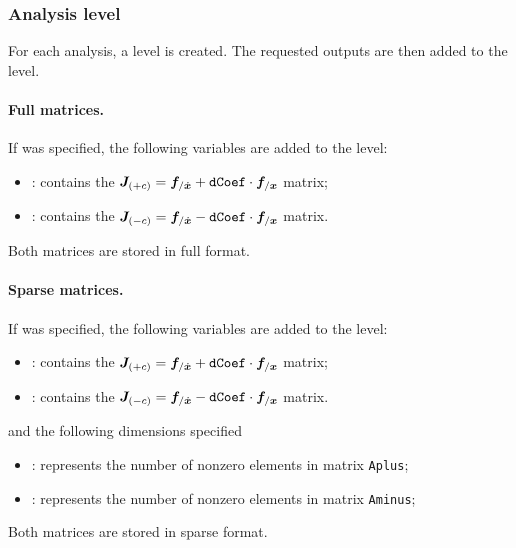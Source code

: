 \subsubsection{Analysis level}
For each analysis, a level  is created. The requested outputs 
are then added to the level.

\paragraph{Full matrices.}
If  was specified, the following variables are added to the
 level:
\begin{itemize}
\item {} : contains the 
    $\boldsymbol{J}_{(+c)} = \boldsymbol{f}_{/\dot{\boldsymbol{x}}} + \texttt{dCoef} \cdot \boldsymbol{f}_{/\boldsymbol{x}}$ 
    matrix;
\item {} : contains the
    $\boldsymbol{J}_{(-c)} = \boldsymbol{f}_{/\dot{\boldsymbol{x}}} - \texttt{dCoef} \cdot \boldsymbol{f}_{/\boldsymbol{x}}$ 
    matrix.
\end{itemize}
Both matrices are stored in full format.

\paragraph{Sparse matrices.}
If  was specified, the following variables are added to the
 level:
\begin{itemize}
\item {} : contains the 
    $\boldsymbol{J}_{(+c)} = \boldsymbol{f}_{/\dot{\boldsymbol{x}}} + \texttt{dCoef} \cdot \boldsymbol{f}_{/\boldsymbol{x}}$ 
    matrix;
\item {} : contains the
    $\boldsymbol{J}_{(-c)} = \boldsymbol{f}_{/\dot{\boldsymbol{x}}} - \texttt{dCoef} \cdot \boldsymbol{f}_{/\boldsymbol{x}}$ 
    matrix.
\end{itemize}
and the following dimensions specified
\begin{itemize}
\item {} : 
    represents the number of nonzero elements in matrix \texttt{Aplus};
\item {} : 
    represents the number of nonzero elements in matrix \texttt{Aminus};
\end{itemize}
Both matrices are stored in sparse format.

